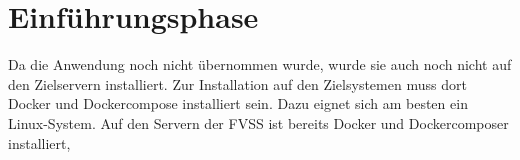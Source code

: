 \section{Einführungsphase}
\label{sec:Einfuehrungsphase}

Da die Anwendung noch nicht übernommen wurde, wurde sie auch noch nicht auf den Zielservern installiert. Zur Installation auf den Zielsystemen muss dort Docker und Dockercompose installiert sein. Dazu eignet sich am besten ein Linux-System. Auf den Servern der \ac{FVSS} ist bereits Docker und Dockercomposer installiert, 